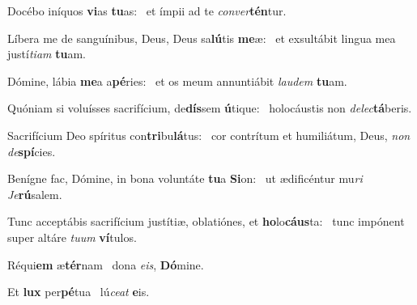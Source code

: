 \item Docébo iníquos \textbf{vi}as \textbf{tu}as:~\psstar{} et ímpii ad te \textit{con}\textit{ver}\textbf{tén}tur.

\item Líbera me de sanguínibus, Deus, Deus sa\textbf{lú}tis \textbf{me}æ:~\psstar{} et exsultábit lingua mea justí\textit{ti}\textit{am} \textbf{tu}am.

\item Dómine, lábia \textbf{me}a a\textbf{pé}ries:~\psstar{} et os meum annuntiábit \textit{lau}\textit{dem} \textbf{tu}am.

\item Quóniam si voluísses sacrifícium, de\textbf{dís}sem \textbf{ú}tique:~\psstar{} holocáustis non \textit{de}\textit{lec}\textbf{tá}beris.

\item Sacrifícium Deo spíritus con\textbf{tri}bu\textbf{lá}tus:~\psstar{} cor contrítum et humiliátum, Deus, \textit{non} \textit{de}\textbf{spí}cies.

\item Benígne fac, Dómine, in bona voluntáte \textbf{tu}a \textbf{Si}on:~\psstar{} ut ædificéntur mu\textit{ri} \textit{Je}\textbf{rú}salem.

\item Tunc acceptábis sacrifícium justítiæ, oblatiónes, et \textbf{ho}lo\textbf{cáus}ta:~\psstar{} tunc impónent super altáre \textit{tu}\textit{um} \textbf{ví}tulos.

\item Réqui\textbf{em} æ\textbf{tér}nam~\psstar{} dona \textit{e}\textit{is}, \textbf{Dó}mine.

\item Et \textbf{lux} per\textbf{pé}tua~\psstar{} lú\textit{ce}\textit{at} \textbf{e}is.